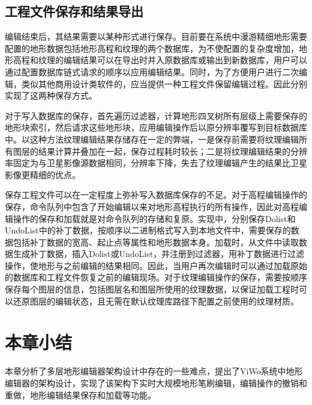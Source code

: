 \subsection{工程文件保存和结果导出}
编辑结束后，其结果需要以某种形式进行保存。目前要在系统中漫游精细地形需要配置的地形数据包括地形高程和纹理的两个数据库，为不使配置的复杂度增加，地形高程和纹理的编辑结果可以在导出时并入原数据库或输出到新数据库，用户可以通过配置数据库链式请求的顺序以应用编辑结果。同时，为了方便用户进行二次编辑，类似其他商用设计类软件的，应当提供一种工程文件保留编辑过程。因此分别实现了这两种保存方式。\par
对于写入数据库的保存，首先遍历过滤器，计算地形四叉树所有层级上需要保存的地形块索引，然后请求这些地形块，应用编辑操作后以原分辨率覆写到目标数据库中。以这种方法纹理编辑结果存储存在一定的弊端，一是保存前需要将纹理编辑所有图层的结果计算并叠加在一起，保存过程耗时较长；二是将纹理编辑结果的分辨率固定为与卫星影像源数据相同，分辨率下降，失去了纹理编辑产生的结果比卫星影像更精细的优点。\par
保存工程文件可以在一定程度上弥补写入数据库保存的不足。对于高程编辑操作的保存，命令队列中包含了开始编辑以来对地形高程执行的所有操作，因此对高程编辑操作的保存和加载就是对命令队列的存储和复原。实现中，分别保存Dolist和UndoList中的补丁数据，按顺序以二进制格式写入到本地文件中，需要保存的数据包括补丁数据的宽高、起止点等属性和地形数据本身。加载时，从文件中读取数据生成补丁数据，插入Dolist或UndoList，并注册到过滤器，用补丁数据进行过滤操作，使地形与之前编辑的结果相同。因此，当用户再次编辑时可以通过加载原始的数据库和工程文件恢复之前的编辑现场。对于纹理编辑操作的保存，需要按顺序保存每个图层的信息，包括图层名和图层所使用的纹理数据，以保证加载工程时可以还原图层的编辑状态，且无需在默认纹理库路径下配置之前使用的纹理材质。\par


\section{本章小结}
本章分析了多层地形编辑器架构设计中存在的一些难点，提出了ViWo系统中地形编辑器的架构设计，实现了该架构下实时大规模地形笔刷编辑，编辑操作的撤销和重做，地形编辑结果保存和加载等功能。
